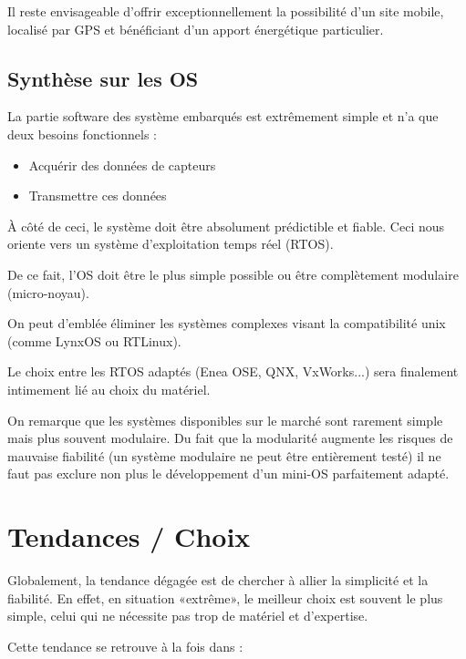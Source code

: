 \documentclass{article}
\begin{document}
Il reste envisageable d’offrir exceptionnellement la possibilité d’un
site mobile, localisé par GPS et bénéficiant d’un apport énergétique
particulier.

\subsection{Synthèse sur les OS}
La partie software des système embarqués est extrêmement simple et n’a
que deux besoins fonctionnels :

\begin{itemize}
\item Acquérir des données de capteurs
\item Transmettre ces données
\end{itemize}
À côté de ceci, le système doit être absolument prédictible et fiable.
Ceci nous oriente vers un système d’exploitation temps réel (RTOS).

De ce fait, l’OS doit être le plus simple possible ou être complètement
modulaire (micro-noyau).

On peut d’emblée éliminer les systèmes complexes visant la compatibilité
unix (comme LynxOS ou RTLinux).

Le choix entre les RTOS adaptés (Enea OSE, QNX, VxWorks...) sera
finalement intimement lié au choix du matériel.

On remarque que les systèmes disponibles sur le marché sont rarement
simple mais plus souvent modulaire. Du fait que la modularité augmente
les risques de mauvaise fiabilité (un système modulaire ne peut être
entièrement testé) il ne faut pas exclure non plus le développement
d’un mini-OS parfaitement adapté.

\section{Tendances / Choix}
Globalement, la tendance dégagée est de chercher à allier la simplicité
et la fiabilité. En effet, en situation «extrême», le meilleur choix
est souvent le plus simple, celui qui ne nécessite pas trop de matériel
et d’expertise.

Cette tendance se retrouve à la fois dans :
\end{document}

